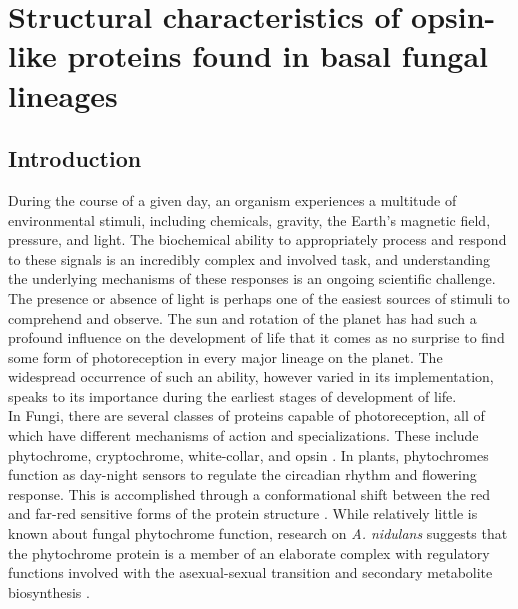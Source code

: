 \chapter{Structural characteristics of opsin-like proteins found in basal fungal lineages}
\label{chap:RhodStruct}
\section{Introduction}
During the course of a given day, an organism experiences a multitude of environmental stimuli, including chemicals, gravity, the Earth's magnetic field, pressure, and light. The biochemical ability to appropriately process and respond to these signals is an incredibly complex and involved task, and understanding the underlying mechanisms of these responses is an ongoing scientific challenge. \\
\indent The presence or absence of light is perhaps one of the easiest sources of stimuli to comprehend and observe. The sun and rotation of the planet has had such a profound influence on the development of life that it comes as no surprise to find some form of photoreception in every major lineage on the planet. The widespread occurrence of such an ability, however varied in its implementation, speaks to its importance during the earliest stages of development of life. \\
\indent In Fungi, there are several classes of proteins capable of photoreception, all of which have different mechanisms of action and specializations. These include phytochrome, cryptochrome, white-collar, and opsin \cite{Idnurm2010}. In plants, phytochromes function as day-night sensors to regulate the circadian rhythm and flowering response. This is accomplished through a conformational shift between the red and far-red sensitive forms of the protein structure \cite{Rockwell2006}. While relatively little is known about fungal phytochrome function, research on \textit{A. nidulans} suggests that the phytochrome protein is a member of an elaborate complex with regulatory functions involved with the asexual-sexual transition and secondary metabolite biosynthesis \cite{Idnurm2010}.\\
